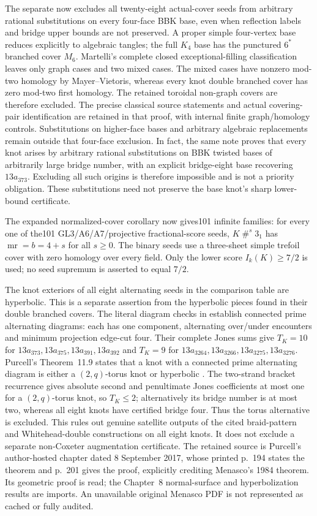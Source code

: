 \documentclass[11pt]{article}
\newcommand{\mr}{\operatorname{mr}}
\begin{document}
{The separate  now excludes
all twenty-eight actual-cover seeds from arbitrary rational
substitutions on every four-face BBK base, even when reflection
labels and bridge upper bounds are not preserved. A proper simple
four-vertex base reduces explicitly to algebraic tangles; the full
$K_4$ base has the punctured $6^*$ branched cover $M_6$.
Martelli's complete closed exceptional-filling classification leaves
only graph cases and two mixed cases. The mixed cases have nonzero
mod-two homology by Mayer--Vietoris, whereas every knot double
branched cover has zero mod-two first homology. The retained toroidal
non-graph covers are therefore excluded. The precise classical source
statements and actual covering-pair identification are retained in
that proof, with internal finite graph/homology controls. Substitutions
on higher-face bases and arbitrary algebraic replacements remain
outside that four-face exclusion. In fact, the same note proves that
every knot arises by arbitrary rational substitutions on BBK twisted
bases of arbitrarily large bridge number, with an explicit bridge-eight
base recovering $13a_{373}$. Excluding all such origins is therefore
impossible and is not a priority obligation. These substitutions need
not preserve the base knot's sharp lower-bound certificate.

The expanded normalized-cover corollary now gives101 infinite families:
for every one of the101 GL3/A6/A7/projective fractional-score seeds,
$K\mathbin{\#}^{s}3_1$ has $\mr=b=4+s$ for all $s\ge0$.
The binary seeds use a three-sheet simple trefoil cover with zero
homology over every field. Only the lower score $I_k(K)\ge7/2$ is
used; no seed supremum is asserted to equal $7/2$.

The knot exteriors of all eight alternating seeds in the comparison
table are hyperbolic. This is a separate assertion from the hyperbolic
pieces found in their double branched covers. The literal diagram
checks in  establish
connected prime alternating diagrams: each has one component,
alternating over/under encounters and minimum projection edge-cut
four. Their complete Jones sums give $T_K=10$ for
$13a_{373},13a_{375},13a_{391},13a_{392}$ and $T_K=9$
for $13a_{3264},13a_{3266},13a_{3275},13a_{3276}$.
Purcell's Theorem~11.9 states that a knot with a connected prime
alternating diagram is either a $(2,q)$-torus knot or hyperbolic
\cite{purcell17}. The two-strand bracket recurrence gives absolute
second and penultimate Jones coefficients at most one for a
$(2,q)$-torus knot, so $T_K\le2$; alternatively its bridge number
is at most two, whereas all eight knots have certified bridge four.
Thus the torus alternative is excluded. This rules out genuine
satellite outputs of the cited braid-pattern and Whitehead-double
constructions on all eight knots. It does not exclude a separate
non-Coxeter augmentation certificate. The retained source is
Purcell's author-hosted chapter dated 8 September 2017, whose
printed p.~194 states the theorem and p.~201 gives the proof,
explicitly crediting Menasco's 1984 theorem. Its geometric proof is
read; the Chapter~8 normal-surface and hyperbolization results are
imports. An unavailable original Menasco PDF is not represented
as cached or fully audited.

}
\end{document}

